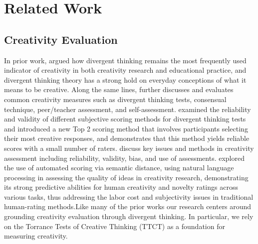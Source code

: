 \section{Related Work}
\subsection{Creativity Evaluation}
In prior work, \citet{baer2014creativity} argued how divergent thinking remains the most frequently used indicator of creativity in both creativity research and educational practice, and divergent thinking theory has a strong hold on everyday conceptions of what it means to be creative. Along the same lines, \citet{kaufman2008essentials} further discusses and evaluates common creativity measures such as divergent thinking tests, consensual technique, peer/teacher assessment, and self-assessment. \citet{silvia2008assessing} examined the reliability and validity of different subjective scoring methods for divergent thinking tests and introduced a new Top 2 scoring method that involves participants selecting their most creative responses, and demonstrates that this method yields reliable scores with a small number of raters. \citet{plucker2010assessment} discuss key issues and methods in creativity assessment including reliability, validity, bias, and use of assessments. \citet{beaty2021automating} explored the use of automated scoring via semantic distance, using natural language processing in assessing the quality of ideas in creativity research, demonstrating its strong predictive abilities for human creativity and novelty ratings across various tasks, thus addressing the labor cost and subjectivity issues in traditional human-rating methods.Like many of the prior works our research centers around grounding creativity evaluation through divergent thinking. In particular, we rely on the Torrance Tests of Creative Thinking (TTCT) as a foundation for measuring creativity.
